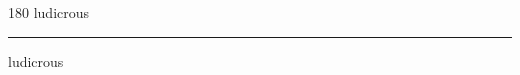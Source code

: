 
\begin{frame}
\begin{center}
\begin{turn}{180}
{\fontsize{2.5cm}{1em}\selectfont ludicrous}
\end{turn}
\vspace{1em}\par  
\hrule
\vspace{1em}\par  
{\fontsize{2.5cm}{1em}\selectfont ludicrous}
\end{center}
\end{frame}
